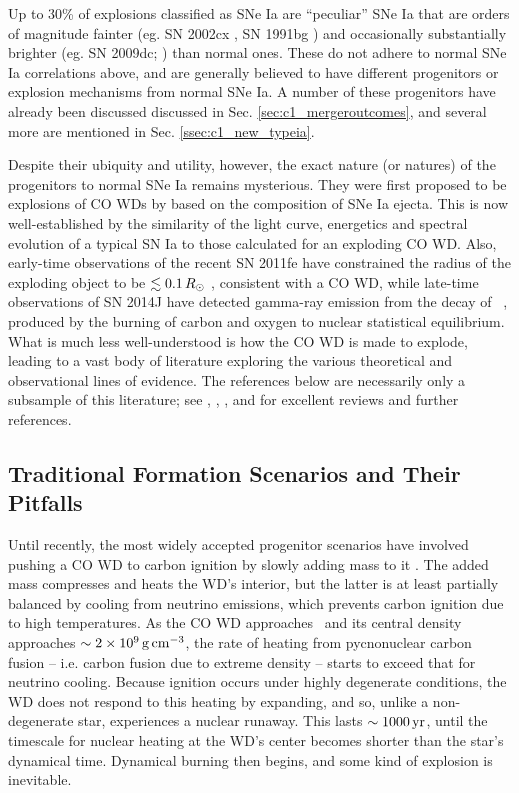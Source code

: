 Up to $30$\% \citep{li+11} of explosions classified as SNe Ia are ``peculiar'' SNe Ia that are orders of magnitude fainter (eg. SN 2002cx \citep{li+02, fole+13}, SN 1991bg \citep{mazz+97}) and occasionally substantially brighter (eg. SN 2009dc; \citealt{yama+09, taub+09}) than normal ones.  These do not adhere to normal SNe Ia correlations above, and are generally believed to have different progenitors or explosion mechanisms from normal SNe Ia.  A number of these progenitors have already been discussed discussed in Sec. \ref{sec:c1_mergeroutcomes}, and several more are mentioned in Sec. \ref{ssec:c1_new_typeia}.

Despite their ubiquity and utility, however, the exact nature (or natures) of the progenitors to normal SNe Ia remains mysterious.  They were first proposed to be explosions of CO WDs by \cite{hoylf60} based on the composition of SNe Ia ejecta.  This is now well-established by the similarity of the light curve, energetics and spectral evolution of a typical SN Ia to those calculated for an exploding CO WD.  Also, early-time observations of the recent SN 2011fe have constrained the radius of the exploding object to be $\lesssim0.1\,\Rsun$ \citep{nuge+11, bloo+12,maozmn14}, consistent with a CO WD, while late-time observations of SN 2014J have detected gamma-ray emission from the decay of \Ni\ \citep{chur+14}, produced by the burning of carbon and oxygen to nuclear statistical equilibrium.  What is much less well-understood is how the CO WD is made to explode, leading to a vast body of literature exploring the various theoretical and observational lines of evidence.  The references below are necessarily only a subsample of this literature; see \cite{howe11}, \cite{hill+13}, \cite{maozmn14}, and \cite{tsebs15} for excellent reviews and further references.

\subsection{Traditional Formation Scenarios and Their Pitfalls}
\label{ssec:c1_old_typeia}

Until recently, the most widely accepted progenitor scenarios have involved pushing a CO WD to carbon ignition by slowly adding mass to it \citep{hilln00}.  The added mass compresses and heats the WD's interior, but the latter is at least partially balanced by cooling from neutrino emissions, which prevents carbon ignition due to high temperatures.  As the CO WD approaches \Mch\ and its central density approaches $\sim2\times10^9\,\gcc$, the rate of heating from pycnonuclear carbon fusion -- i.e. carbon fusion due to extreme density -- starts to exceed that for neutrino cooling.  Because ignition occurs under highly degenerate conditions, the WD does not respond to this heating by expanding, and so, unlike a non-degenerate star, experiences a nuclear runaway.  This lasts $\sim1000\,\mathrm{yr}$, until the timescale for nuclear heating at the WD's center becomes shorter than the star's dynamical time.  Dynamical burning then begins, and some kind of explosion is inevitable.

